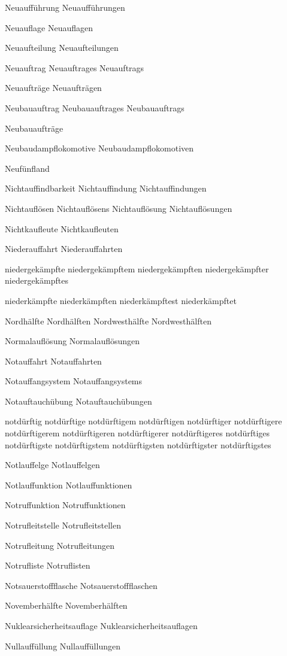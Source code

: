 Neuaufführung
Neuaufführungen

Neuauflage
Neuauflagen

Neuaufteilung
Neuaufteilungen

Neuauftrag
Neuauftrages
Neuauftrags

Neuaufträge
Neuaufträgen

Neubauauftrag
Neubauauftrages
Neubauauftrags

Neubauaufträge

Neubaudampflokomotive
Neubaudampflokomotiven

Neufünfland

Nichtauffindbarkeit
Nichtauffindung
Nichtauffindungen

Nichtauflösen
Nichtauflösens
Nichtauflösung
Nichtauflösungen

Nichtkaufleute
Nichtkaufleuten

Niederauffahrt
Niederauffahrten

niedergekämpfte
niedergekämpftem
niedergekämpften
niedergekämpfter
niedergekämpftes

niederkämpfte
niederkämpften
niederkämpftest
niederkämpftet

Nordhälfte
Nordhälften
Nordwesthälfte
Nordwesthälften

Normalauflösung
Normalauflösungen

Notauffahrt
Notauffahrten

Notauffangsystem
Notauffangsystems

Notauftauchübung
Notauftauchübungen

notdürftig
notdürftige
notdürftigem
notdürftigen
notdürftiger
notdürftigere
notdürftigerem
notdürftigeren
notdürftigerer
notdürftigeres
notdürftiges
notdürftigste
notdürftigstem
notdürftigsten
notdürftigster
notdürftigstes

Notlauffelge
Notlauffelgen

Notlauffunktion
Notlauffunktionen

Notruffunktion
Notruffunktionen

Notrufleitstelle
Notrufleitstellen

Notrufleitung
Notrufleitungen

Notrufliste
Notruflisten

Notsauerstoffflasche
Notsauerstoffflaschen

Novemberhälfte
Novemberhälften

Nuklearsicherheitsauflage
Nuklearsicherheitsauflagen

Nullauffüllung
Nullauffüllungen


